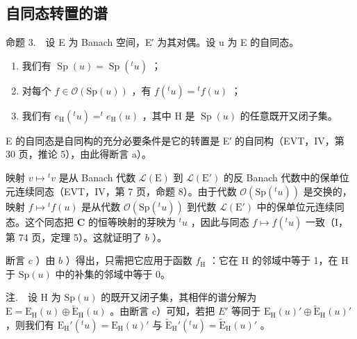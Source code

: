 \subsection{自同态转置的谱}

命题 3.　设 E 为 Banach 空间，E′ 为其对偶。设 u 为 E 的自同态。

\begin{enumerate}
\def\labelenumi{\alph{enumi})}
\item
  我们有 \(\operatorname{Sp}(u) = \operatorname{Sp}(^t u)\) ；
\item
  对每个 \(f \in \mathcal{O}(\mathrm{Sp}(u))\) ，有 \(f(^t u) = {}^t f(u)\) ；
\item
  我们有 \(e_{\mathrm{H}}(^{t}u)=^{t}e_{\mathrm{H}}(u)\) ，其中 H 是 \(\operatorname{Sp}(u)\) 的任意既开又闭子集。
\end{enumerate}

E 的自同态是自同构的充分必要条件是它的转置是 E′ 的自同构（EVT，IV，第 30 页，推论 5），由此得断言 a）。

映射 \(v \mapsto {}^t v\) 是从 Banach 代数 \(\mathcal{L}(\mathrm{E})\) 到 \(\mathcal{L}(\mathrm{E}')\) 的反 Banach 代数中的保单位元连续同态（EVT，IV，第 7 页，命题 8）。由于代数 \(\mathcal{O}(\mathrm{Sp}({}^t u))\) 是交换的，映射 \(f \mapsto {}^t f(u)\) 是从代数 \(\mathcal{O}(\mathrm{Sp}({}^t u))\) 到代数 \(\mathcal{L}(\mathrm{E}')\) 中的保单位元连续同态。这个同态把 \(\mathbf{C}\) 的恒等映射的芽映为 \({}^t u\) ，因此与同态 \(f \mapsto f({}^t u)\) 一致（I，第 74 页，定理 5）。这就证明了 \(b\) ）。

断言 \(c\) ）由 \(b\) ）得出，只需把它应用于函数 \(f_{\mathrm{H}}\) ：它在 H 的邻域中等于 1，在 H 于 \(\mathrm{Sp}(u)\) 中的补集的邻域中等于 0。

注.　设 H 为 \(\mathrm{Sp}(u)\) 的既开又闭子集，其相伴的谱分解为 \(\mathrm{E} = \mathrm{E}_{\mathrm{H}}(u) \oplus \widetilde{\mathrm{E}}_{\mathrm{H}}(u)\) 。由断言 c）可知，若把 \(E'\) 等同于 \(\mathrm{E}_{\mathrm{H}}(u)' \oplus \widetilde{\mathrm{E}}_{\mathrm{H}}(u)'\) ，则我们有 \(\mathrm{E}_{\mathrm{H}}'(^{t}u) = \mathrm{E}_{\mathrm{H}}(u)'\) 与 \(\widetilde{\mathrm{E}}_{\mathrm{H}}'(^{t}u) = \widetilde{\mathrm{E}}_{\mathrm{H}}(u)'\) 。

